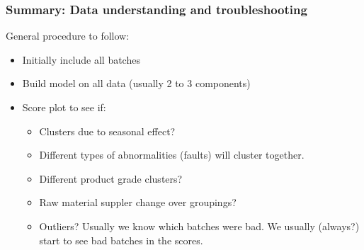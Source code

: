 
\begin{frame}\frametitle{Summary: Data understanding and troubleshooting}
	
General procedure to follow:	

\begin{itemize}
	\item	Initially include all batches
	
	\item	Build model on all data (usually 2 to 3 components)
	
	\item	Score plot to see if: \hfill {}
	
			\begin{itemize}
				\item	Clusters due to seasonal effect?
				
				\item	Different types of abnormalities (faults) will cluster together.
				
				\item	Different product grade clusters?
				
				\item	Raw material suppler change over groupings?
				
				\item	Outliers? Usually we know which batches were bad.  We usually (always?) start to see bad batches in the scores.
			\end{itemize}
\end{itemize}

\end{frame}